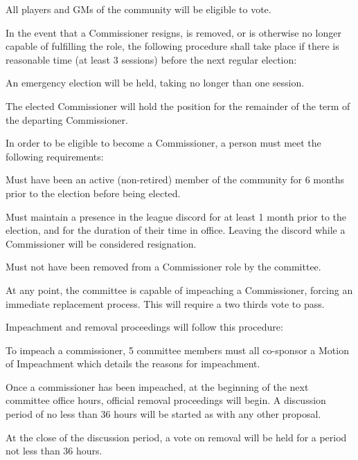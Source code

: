 \begin{deepEnumerate}
\begin{deepEnumerate}
		\item All players and GMs of the community will be eligible to vote.
	\end{deepEnumerate}
	\item In the event that a Commissioner resigns, is removed, or is otherwise no longer capable of fulfilling the role, the following procedure shall take place 
	if there is reasonable time (at least 3 sessions) before the next regular election:
	\begin{deepEnumerate}
		\item An emergency election will be held, taking no longer than one session.
		\item The elected Commissioner will hold the position for the remainder of the term of the departing Commissioner.
	\end{deepEnumerate}
	\item In order to be eligible to become a Commissioner, a person must meet the following requirements:
	\begin{deepEnumerate}
		\item Must have been an active (non-retired) member of the community for 6 months prior to the election before being elected.
		\item Must maintain a presence in the league discord for at least 1 month prior to the election, and for the duration of their time in office. 
		Leaving the discord while a Commissioner will be considered resignation.
		\item Must not have been removed from a Commissioner role by the committee.	
	\end{deepEnumerate}
	\item At any point, the committee is capable of impeaching a Commissioner, forcing an immediate replacement process. This will require a two thirds vote to pass.
	\begin{deepEnumerate}
		\item Impeachment and removal proceedings will follow this procedure:
		\begin{deepEnumerate}
			\item To impeach a commissioner, 5 committee members must all co-sponsor a Motion of Impeachment which details the reasons for impeachment.
			\item Once a commissioner has been impeached, at the beginning of the next committee office hours, official removal proceedings will begin. 
			A discussion period of no less than 36 hours will be started as with any other proposal.
			\item At the close of the discussion period, a vote on removal will be held for a period not less than 36 hours. 

\end{deepEnumerate}
\end{deepEnumerate}
\end{deepEnumerate}
